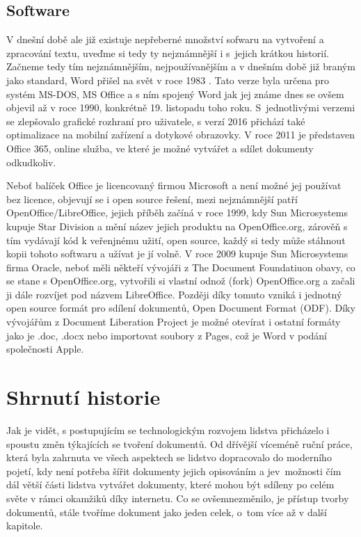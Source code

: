 \subsection{Software}

V dnešní době ale již existuje nepřeberné množství sofwaru na vytvoření a zpracování textu, uveďme si tedy ty nejznámnější i s~jejich krátkou historií. Začneme tedy
tím nejznámnějším, nejpoužívanějším a v dnešním době již braným jako standard, Word přišel na svět v roce 1983 \cite{word83}. Tato verze byla určena pro systém MS-DOS,
MS Office a s ním spojený Word jak jej známe dnes se ovšem objevil až v roce 1990, konkrétně 19. listopadu toho roku. S~jednotlivými verzemi se zlepšovalo grafické
rozhraní pro uživatele, s verzí 2016 přichází také optimalizace na mobilní zařízení a dotykové obrazovky. V roce 2011 je představen Office 365, online služba, ve
které je možné vytvářet a sdílet dokumenty odkudkoliv. \cite{word}

Neboť balíček Office je licencovaný firmou Microsoft a není možné jej používat bez licence, objevují se i open source řešení, mezi nejznámnější patří OpenOffice/LibreOffice,
jejich příběh začíná v roce 1999, kdy Sun Microsystems kupuje Star Division a mění název jejich produktu na OpenOffice.org, zárověň s tím vydávají kód k veřenjnému užití, open source,
každý si tedy může stáhnout kopii tohoto softwaru a užívat je jí volně. V roce 2009 kupuje Sun Microsystems firma Oracle, neboť měli někteří vývojáři z The Document Foundatiuon obavy,
co se stane s OpenOffice.org, vytvořili si vlastní odnož (fork) OpenOffice.org a začali ji dále rozvíjet pod názvem LibreOffice. Později díky tomuto vzniká i jednotný open source
formát pro sdílení dokumentů, Open Document Format (ODF). Díky vývojářům z Document Liberation Project je možné otevírat i ostatní formáty jako je .doc, .docx nebo importovat
soubory z Pages, což je Word v podání společnosti Apple. \cite{LibreHist}

\section{Shrnutí historie}

Jak je vidět, s postupujícím se technologickým rozvojem lidstva přicházelo i spoustu změn týkajících se tvoření dokumentů. Od dřívější víceméně ruční práce, která byla zahrnuta
ve všech aspektech se lidstvo dopracovalo do moderního pojetí, kdy není potřeba šířit dokumenty jejich opisováním a je\linebreak v~možnosti čím dál větší části lidstva vytvářet dokumenty,
které mohou být sdíleny po celém světe v rámci okamžiků díky internetu. Co se ovšem\linebreak nezměnilo, je přístup tvorby dokumentů, stále tvoříme dokument jako jeden celek, o~tom více
až v další kapitole.